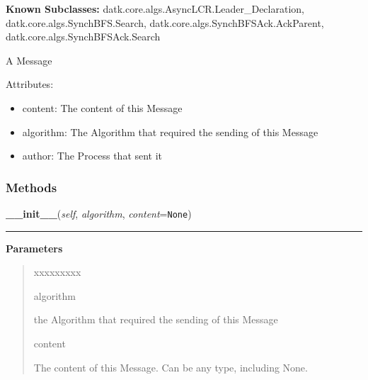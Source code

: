     \label{datk:core:distalgs:Message}
\textbf{Known Subclasses:}
datk.core.algs.AsyncLCR.Leader\_Declaration,
    datk.core.algs.SynchBFS.Search,
    datk.core.algs.SynchBFSAck.AckParent,
    datk.core.algs.SynchBFSAck.Search

A Message

Attributes:

\begin{itemize}
\setlength{\parskip}{0.6ex}
  \item content: The content of this Message

  \item algorithm: The Algorithm that required the sending of this Message

  \item author: The Process that sent it

\end{itemize}



  \subsubsection{Methods}

    \label{datk:core:distalgs:Message:__init__}

    \vspace{0.5ex}

\hspace{.8\funcindent}\begin{boxedminipage}{\funcwidth}

    \raggedright \textbf{\_\_init\_\_}(\textit{self}, \textit{algorithm}, \textit{content}={\tt None})

    \vspace{-1.5ex}

    \rule{\textwidth}{0.5\fboxrule}
\setlength{\parskip}{2ex}
\setlength{\parskip}{1ex}
      \textbf{Parameters}
      \vspace{-1ex}

      \begin{quote}
        \begin{Ventry}{xxxxxxxxx}

          \item[algorithm]

          the Algorithm that required the sending of this Message

          \item[content]

          The content of this Message. Can be any type, including None.

        \end{Ventry}

      \end{quote}

    \end{boxedminipage}

